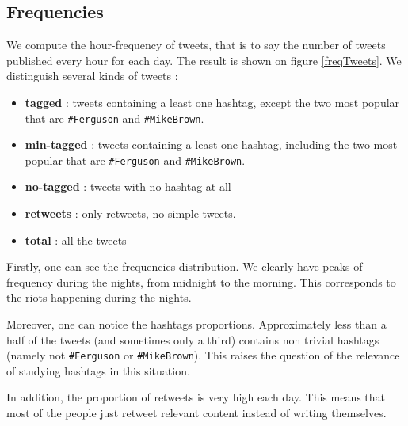 \documentclass[a4paper,twoside,12pt,openright]{report}
\begin{document}
\subsection{Frequencies}
We compute the hour-frequency of tweets, that is to say the number of tweets published every hour for each day. The result is shown on figure \ref{freqTweets}. We distinguish several kinds of tweets : 
\begin{itemize}
\item \textbf{tagged} : tweets containing a least one hashtag, \underline{except} the two most popular that are \texttt{\#Ferguson} and \texttt{\#MikeBrown}.
\item \textbf{min-tagged} : tweets containing a least one hashtag, \underline{including} the two most popular that are \texttt{\#Ferguson} and \texttt{\#MikeBrown}.
\item \textbf{no-tagged} : tweets with no hashtag at all
\item \textbf{retweets} : only retweets, no simple tweets.
\item \textbf{total} : all the tweets
\end{itemize}

Firstly, one can see the frequencies distribution. We clearly have peaks of frequency during the nights, from midnight to the morning. This corresponds to the riots happening during the nights.

Moreover, one can notice the hashtags proportions. Approximately less than a half of the tweets (and sometimes only a third) contains non trivial hashtags (namely not \texttt{\#Ferguson} or \texttt{\#MikeBrown}). This raises the question of the relevance of studying hashtags in this situation.

In addition, the proportion of retweets is very high each day. This means that most of the people just retweet relevant content instead of writing themselves.
\end{document}

